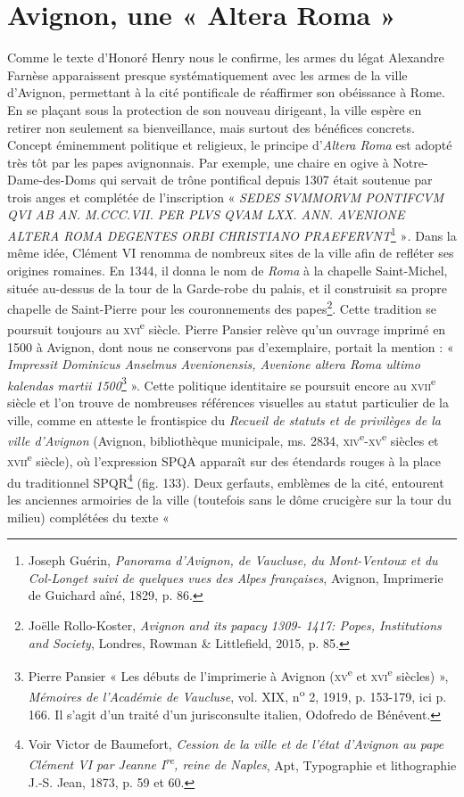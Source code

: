 \documentclass[12pt,twoside,openany]{book}
\begin{document}
\section{Avignon, une « Altera Roma »}

Comme le texte d’Honoré Henry nous le confirme, les armes du légat Alexandre Farnèse apparaissent presque systématiquement avec les armes de la ville d’Avignon, permettant à la cité pontificale de réaffirmer son obéissance à Rome. En se plaçant sous la protection de son nouveau dirigeant, la ville espère en retirer non seulement sa bienveillance, mais surtout des bénéfices concrets. Concept éminemment politique et religieux, le principe d’\textit{Altera Roma} est adopté très tôt par les papes avignonnais. Par exemple, une chaire en ogive à Notre-Dame-des-Doms qui servait de trône pontifical depuis 1307 était soutenue par trois anges et complétée de l’inscription « \textit{SEDES SVMMORVM PONTIFCVM QVI AB AN. M.CCC.VII. PER PLVS QVAM LXX. ANN. AVENIONE ALTERA ROMA DEGENTES ORBI CHRISTIANO PRAEFERVNT}\footnote{Joseph Guérin, \textit{Panorama d’Avignon, de Vaucluse, du Mont-Ventoux et du Col-Longet suivi de quelques vues des Alpes françaises}, Avignon, Imprimerie de Guichard aîné, 1829, p. 86.} »\textit{.} Dans la même idée, Clément VI renomma de nombreux sites de la ville afin de refléter ses origines romaines. En 1344, il donna le nom de \textit{Roma} à la chapelle Saint-Michel, située au-dessus de la tour de la Garde-robe du palais, et il construisit sa propre chapelle de Saint-Pierre pour les couronnements des papes\footnote{Joëlle Rollo-Koster, \textit{Avignon and its papacy 1309- 1417: Popes, Institutions and Society}, Londres, Rowman \& Littlefield, 2015, p. 85.}. Cette tradition se poursuit toujours au \textsc{xvi}\textsuperscript{e} siècle. Pierre Pansier relève qu’un ouvrage imprimé en 1500 à Avignon, dont nous ne conservons pas d’exemplaire, portait la mention : « \textit{Impressit Dominicus Anselmus Avenionensis, Avenione altera Roma ultimo kalendas martii 1500}\footnote{Pierre Pansier « Les débuts de l’imprimerie à Avignon (\textsc{xv}\textsuperscript{e} et \textsc{xvi}\textsuperscript{e} siècles) », \textit{Mémoires de l’Académie de Vaucluse}, vol. XIX, n\textsuperscript{o} 2, 1919, p. 153-179, ici p. 166. Il s’agit d’un traité d’un jurisconsulte italien, Odofredo de Bénévent.} ». Cette politique identitaire se poursuit encore au \textsc{xvii}\textsuperscript{e} siècle et l’on trouve de nombreuses références visuelles au statut particulier de la ville, comme en atteste le frontispice du \textit{Recueil de statuts et de privilèges de la ville d’Avignon }(Avignon, bibliothèque municipale, ms. 2834, \textsc{xiv}\textsuperscript{e}-\textsc{xv}\textsuperscript{e} siècles et \textsc{xvii}\textsuperscript{e} siècle), où l’expression SPQA apparaît sur des étendards rouges à la place du traditionnel SPQR\footnote{Voir Victor de Baumefort, \textit{Cession de la ville et de l’état d’Avignon au pape Clément VI par Jeanne I}\textit{\textsuperscript{re}}\textit{, reine de Naples}, Apt, Typographie et lithographie J.-S. Jean, 1873, p. 59 et 60.} (fig. 133). Deux gerfauts, emblèmes de la cité, entourent les anciennes armoiries de la ville (toutefois sans le dôme crucigère sur la tour du milieu) complétées du texte « 
\end{document}
